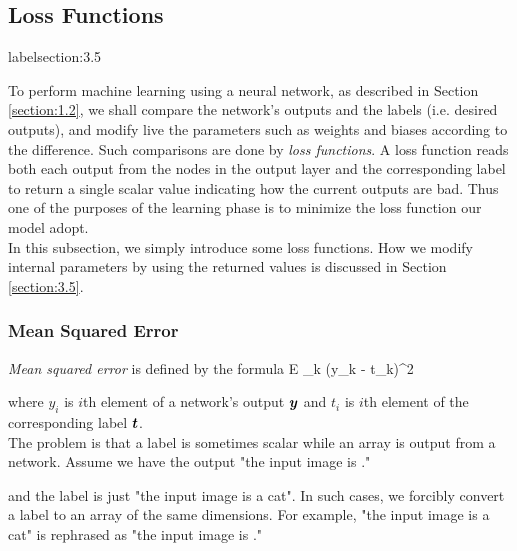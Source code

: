 \documentclass{article}
\theoremstyle{definition}
\newcommand{\sect}[1]{Section \ref{section:#1}}
\begin{document}
\subsection{Loss Functions} label{section:3.5}

To perform machine learning using a neural network, as described in \sect{1.2}, we shall compare the network's outputs and the labels (i.e. desired outputs), and modify live the parameters such as weights and biases according to the difference. Such comparisons are done by {\it loss functions}. A loss function reads both each output from the nodes in the output layer and the corresponding label to return a single scalar value indicating how the current outputs are bad. Thus one of the purposes of the learning phase is to minimize the loss function our model adopt.\\

In this subsection, we simply introduce some loss functions. How we modify internal parameters by using the returned values is discussed in \sect{3.5}.

\subsubsection{Mean Squared Error} \label{section:3.3.1}

{\it Mean squared error} is defined by the formula
\begineq
E \equiv \half \sum _k (y_k - t_k)^2 
\edeq

where $y_i$ is $i$th element of a network's output $\bmy$ and $t_i$ is $i$th element of the corresponding label $\bmt$.\\

The problem is that a label is sometimes scalar while an array is output from a network. Assume we have the output "the input image is
\begineq
{}." \nonumber
\edeq

and the label is just "the input image is a cat". In such cases, we forcibly convert a label to an array of the same dimensions. For example, "the input image is a cat" is rephrased as "the input image is
\begineq
{}." \nonumber
\edeq
\end{document}
